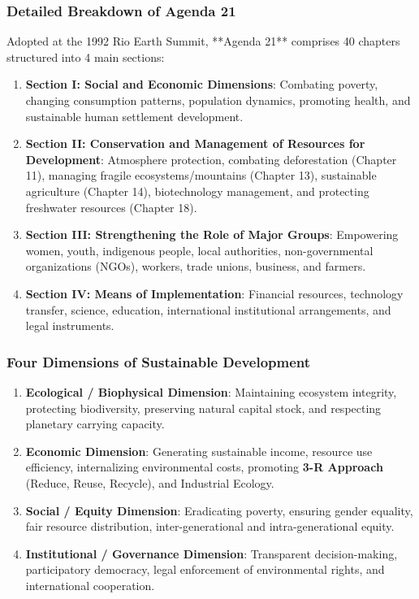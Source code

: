 \documentclass[11pt,a4paper]{article}
\begin{document}
\subsubsection{Detailed Breakdown of Agenda 21}
Adopted at the 1992 Rio Earth Summit, **Agenda 21** comprises 40 chapters structured into 4 main sections:
\begin{enumerate}[leftmargin=*]
  \item \textbf{Section I: Social and Economic Dimensions}: Combating poverty, changing consumption patterns, population dynamics, promoting health, and sustainable human settlement development.
  \item \textbf{Section II: Conservation and Management of Resources for Development}: Atmosphere protection, combating deforestation (Chapter 11), managing fragile ecosystems/mountains (Chapter 13), sustainable agriculture (Chapter 14), biotechnology management, and protecting freshwater resources (Chapter 18).
  \item \textbf{Section III: Strengthening the Role of Major Groups}: Empowering women, youth, indigenous people, local authorities, non-governmental organizations (NGOs), workers, trade unions, business, and farmers.
  \item \textbf{Section IV: Means of Implementation}: Financial resources, technology transfer, science, education, international institutional arrangements, and legal instruments.
\end{enumerate}

\subsubsection{Four Dimensions of Sustainable Development}
\begin{enumerate}[leftmargin=*]
  \item \textbf{Ecological / Biophysical Dimension}: Maintaining ecosystem integrity, protecting biodiversity, preserving natural capital stock, and respecting planetary carrying capacity.
  \item \textbf{Economic Dimension}: Generating sustainable income, resource use efficiency, internalizing environmental costs, promoting \textbf{3-R Approach} (Reduce, Reuse, Recycle), and Industrial Ecology.
  \item \textbf{Social / Equity Dimension}: Eradicating poverty, ensuring gender equality, fair resource distribution, inter-generational and intra-generational equity.
  \item \textbf{Institutional / Governance Dimension}: Transparent decision-making, participatory democracy, legal enforcement of environmental rights, and international cooperation.
\end{enumerate}
\end{document}
